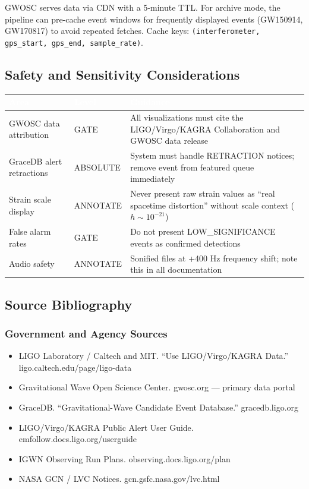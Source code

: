 \documentclass[11pt,letterpaper]{article}
\newcommand{\tableheader}[1]{\textbf{\sffamily\textcolor{white}{#1}}}
\begin{document}
GWOSC serves data via CDN with a 5-minute TTL. For archive mode, the pipeline can pre-cache event windows for frequently displayed events (GW150914, GW170817) to avoid repeated fetches. Cache keys: \texttt{(interferometer, gps\_start, gps\_end, sample\_rate)}.

\subsection{Safety and Sensitivity Considerations}

\begin{center}
\begin{tabularx}{\textwidth}{L{3cm}L{2.5cm}X}
\toprule
{}
\tableheader{Area} & \tableheader{Level} & \tableheader{Guidance} \\
\midrule
GWOSC data attribution & GATE & All visualizations must cite the LIGO/Virgo/KAGRA Collaboration and GWOSC data release \\
GraceDB alert retractions & ABSOLUTE & System must handle RETRACTION notices; remove event from featured queue immediately \\
Strain scale display & ANNOTATE & Never present raw strain values as ``real spacetime distortion'' without scale context ($h \sim 10^{-21}$) \\
False alarm rates & GATE & Do not present LOW\_SIGNIFICANCE events as confirmed detections \\
Audio safety & ANNOTATE & Sonified files at +400 Hz frequency shift; note this in all documentation \\
\bottomrule
\end{tabularx}
\end{center}

\subsection{Source Bibliography}

\subsubsection{Government and Agency Sources}
\begin{itemize}[noitemsep]
  \item LIGO Laboratory / Caltech and MIT. ``Use LIGO/Virgo/KAGRA Data.'' ligo.caltech.edu/page/ligo-data
  \item Gravitational Wave Open Science Center. gwosc.org --- primary data portal
  \item GraceDB. ``Gravitational-Wave Candidate Event Database.'' gracedb.ligo.org
  \item LIGO/Virgo/KAGRA Public Alert User Guide. emfollow.docs.ligo.org/userguide
  \item IGWN Observing Run Plans. observing.docs.ligo.org/plan
  \item NASA GCN / LVC Notices. gcn.gsfc.nasa.gov/lvc.html
\end{itemize}
\end{document}
